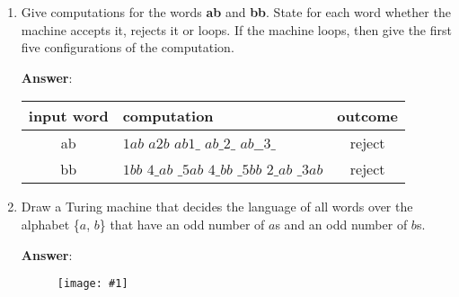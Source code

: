\documentclass[a4paper, 14pt]{report}
\newcommand{\centeredimg}[1]{%
	\begin{figure}[h]
		\begin{center}
			\texttt{[image: \#1]}
		\end{center}
\end{figure}}
\newcommand{\answer}[1]{%
	\textbf{Answer}:\\
#1}
\begin{document}
\begin{enumerate}[label=(\alph*)]
	\setlength\itemsep{2em}

\item Give computations for the words \textbf{ab} and \textbf{bb}. 
	State for each word whether the machine accepts it, rejects it or loops. 
	If the machine loops, then give the first five configurations of the computation.

	\answer{%
		\begin{center}
			\begin{tabular}{ |c|l|c| } 
				\hline
				input word & computation & outcome \\
				\hline
				ab & $1ab$ \hspace{0.1cm} \vdash \hspace{0.2cm} $a2b$ \hspace{0.2cm} \vdash \hspace{0.2cm} $ab1\_$ \hspace{0.2cm} \vdash \hspace{0.2cm} $ab\_2\_$ \hspace{0.2cm} \vdash \hspace{0.2cm} $ab\_\_3\_$ & reject \\
				\hline
				bb & $1bb$ \hspace{0.1cm} \vdash \hspace{0.2cm} $4\_ab$ \hspace{0.2cm} \vdash \hspace{0.2cm} $\_5ab$ \hspace{0.2cm} \vdash \hspace{0.2cm} $4\_bb$ \hspace{0.2cm} \vdash \hspace{0.2cm} $\_5bb$ \hspace{0.2cm} \vdash \hspace{0.2cm} $2\_ab$ \hspace{0.2cm} \vdash \hspace{0.2cm} $\_3ab$ & reject \\
				\hline
			\end{tabular}
	\end{center}}

\item Draw a Turing machine that decides the language of all words
	over the alphabet \{$a$, $b$\} that have an odd number of $a$s and
	an odd number of $b$s.

	\answer{\centeredimg{turing_machine.jpg}}

\end{enumerate}		

\pagebreak
\end{document}
